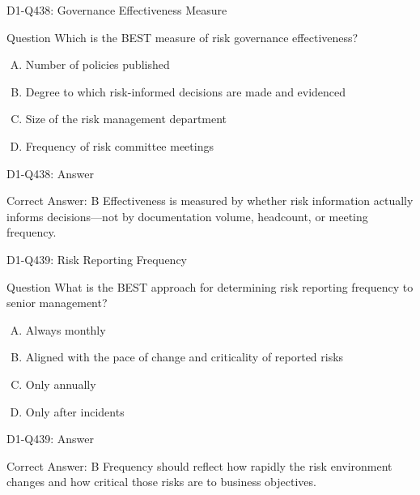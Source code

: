 \documentclass{beamer}
\begin{document}
\begin{frame}{D1-Q438: Governance Effectiveness Measure}
	\begin{block}{Question}
		Which is the BEST measure of risk governance effectiveness?
	\end{block}
	\begin{enumerate}[(A)]
		\item Number of policies published
		\item Degree to which risk-informed decisions are made and evidenced
		\item Size of the risk management department
		\item Frequency of risk committee meetings
	\end{enumerate}
\end{frame}
\begin{frame}{D1-Q438: Answer}
	\begin{block}{Correct Answer: B}
		Effectiveness is measured by whether risk information actually informs decisions—not by documentation volume, headcount, or meeting frequency.
	\end{block}
\end{frame}

\begin{frame}{D1-Q439: Risk Reporting Frequency}
	\begin{block}{Question}
		What is the BEST approach for determining risk reporting frequency to senior management?
	\end{block}
	\begin{enumerate}[(A)]
		\item Always monthly
		\item Aligned with the pace of change and criticality of reported risks
		\item Only annually
		\item Only after incidents
	\end{enumerate}
\end{frame}
\begin{frame}{D1-Q439: Answer}
	\begin{block}{Correct Answer: B}
		Frequency should reflect how rapidly the risk environment changes and how critical those risks are to business objectives.
	\end{block}
\end{frame}
\end{document}
